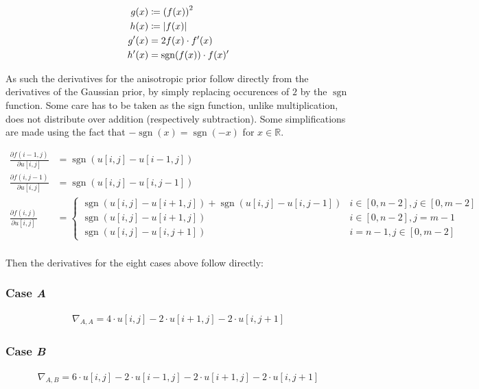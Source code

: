 \documentclass[a4paper]{scrreprt}
\DeclarePairedDelimiter\abs{\lvert}{\rvert}
\DeclareMathOperator{\sgn}{sgn}
\begin{document}
\begin{align*}
		g(x) & \coloneqq \left(f(x)\right)^2 \\
		h(x) & \coloneqq \abs*{f(x)} \\
		g'(x) & = 2 f(x) \cdot f'(x) \\
		h'(x) & = \sgn(f(x)) \cdot f(x)'
\end{align*}

As such the derivatives for the anisotropic prior follow directly from the
derivatives of the Gaussian prior, by simply replacing occurences of $2$ by the
$\sgn$ function. Some care has to be taken as the sign function, unlike
multiplication, does not distribute over addition (respectively subtraction).
Some simplifications are made using the fact that $-\sgn(x) = \sgn(-x)$ for $x
\in \mathbb{R}$.

\begin{align*}
		\frac{\partial f(i - 1, j)}{\partial u[i, j]} & =
		  \sgn(u[i, j] - u[i - 1, j]) \\
		\frac{\partial f(i, j - 1)}{\partial u[i, j]} & =
		  \sgn(u[i, j] - u[i, j - 1]) \\
		\frac{\partial f(i, j)}{\partial u[i, j]} & =
		  \begin{cases}
				  \sgn(u[i, j] - u[i + 1, j]) + \sgn(u[i, j] - u[i, j - 1])
				    & i \in [0, n - 2], j \in [0, m - 2] \\
				  \sgn(u[i, j] - u[i + 1, j])
				    & i \in [0, n - 2], j = m - 1 \\
				  \sgn(u[i, j] - u[i, j + 1])
					& i = n - 1, j \in [0, m - 2]
		  \end{cases} \\
\end{align*}

Then the derivatives for the eight cases above follow directly:

\subsubsection{Case \emph{A}}

\begin{align*}
		\nabla_{A, A} = 
		  4 \cdot u[i, j] - 2 \cdot u[i + 1, j] - 2 \cdot u[i, j + 1]
\end{align*}

\subsubsection{Case \emph{B}}

\begin{align*}
		\nabla_{A, B} = 
		  6 \cdot u[i, j] - 2 \cdot u[i - 1, j] - 2 \cdot u[i + 1, j] - 2 \cdot u[i, j + 1]
\end{align*}
\end{document}
